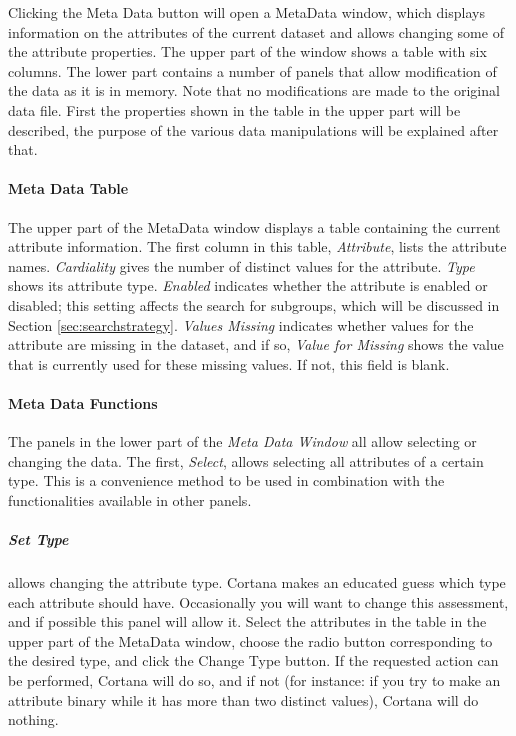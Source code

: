 \documentclass{article}
\begin{document}
Clicking the Meta Data button will open a MetaData window, which displays
information on the attributes of the current dataset and allows changing
some of the attribute properties. The upper part of the window
shows a table with six columns.
The lower part contains a
number of panels that allow modification of the data as it is in memory.
Note that no modifications are made to the original data file.  
First the
properties shown in the table in the upper part will be described, the
purpose of the various data manipulations will be explained after that.

\paragraph{Meta Data Table}
\label{meta-data-window:meta-data-table}

The upper part of the MetaData window displays a table containing the current
attribute information.  The first column in this table, \emph{Attribute},
lists the attribute names.  \emph{Cardiality} gives the number of distinct
values for the attribute.  \emph{Type} shows its attribute \gls{type}. 
\emph{Enabled} indicates whether the attribute is \gls{enabled} or
\gls{disabled}; this setting affects the search for subgroups, which will be
discussed in Section \ref{sec:searchstrategy}.  \emph{Values Missing}
indicates whether values for the attribute are missing in the dataset, and
if so, \emph{Value for Missing} shows the value that is currently used for
these missing values.  If not, this field is blank.

\paragraph{Meta Data Functions}
\label{meta-data-window:meta-data-functions}

The panels in the lower part of the \emph{Meta Data Window} all allow
selecting or changing the data.  The first, \emph{Select}, allows selecting
all attributes of a certain type.  This is a convenience method to be used
in combination with the functionalities available in other panels.

\subparagraph{Set Type} allows changing the attribute \gls{type}.  Cortana
makes an educated guess which \gls{type} each attribute should have. 
Occasionally you will want to change this assessment, and if possible
this panel will allow it.  Select the attributes in the table in the upper
part of the MetaData window, choose the radio button corresponding to the
desired type, and click the Change Type button.  If the requested action can
be performed, Cortana will do so, and if not (for instance: if you try to
make an attribute binary while it has more than two distinct values),
Cortana will do nothing.
\end{document}
